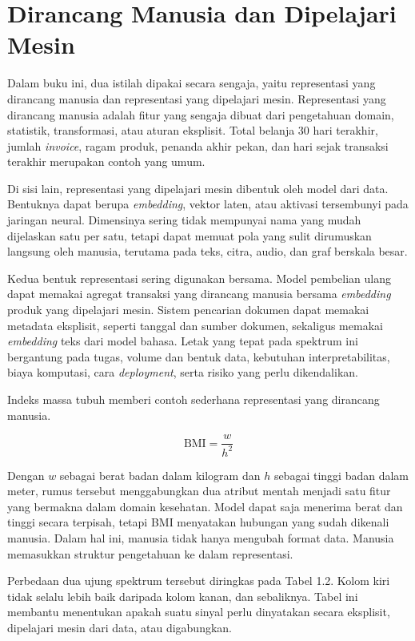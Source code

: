 \section{Dirancang Manusia dan Dipelajari Mesin}\label{dirancang-manusia-dan-dipelajari-mesin}

Dalam buku ini, dua istilah dipakai secara sengaja, yaitu representasi yang dirancang manusia dan representasi yang dipelajari mesin. Representasi yang dirancang manusia adalah fitur yang sengaja dibuat dari pengetahuan domain, statistik, transformasi, atau aturan eksplisit. Total belanja 30 hari terakhir, jumlah \emph{invoice}, ragam produk, penanda akhir pekan, dan hari sejak transaksi terakhir merupakan contoh yang umum.

Di sisi lain, representasi yang dipelajari mesin dibentuk oleh model dari data. Bentuknya dapat berupa \emph{embedding}, vektor laten, atau aktivasi tersembunyi pada jaringan neural. Dimensinya sering tidak mempunyai nama yang mudah dijelaskan satu per satu, tetapi dapat memuat pola yang sulit dirumuskan langsung oleh manusia, terutama pada teks, citra, audio, dan graf berskala besar.

Kedua bentuk representasi sering digunakan bersama. Model pembelian ulang dapat memakai agregat transaksi yang dirancang manusia bersama \emph{embedding} produk yang dipelajari mesin. Sistem pencarian dokumen dapat memakai metadata eksplisit, seperti tanggal dan sumber dokumen, sekaligus memakai \emph{embedding} teks dari model bahasa. Letak yang tepat pada spektrum ini bergantung pada tugas, volume dan bentuk data, kebutuhan interpretabilitas, biaya komputasi, cara \emph{deployment}, serta risiko yang perlu dikendalikan.

Indeks massa tubuh memberi contoh sederhana representasi yang dirancang manusia.

\[
\text{BMI} = \dfrac{w}{h^2}
\]

Dengan \(w\) sebagai berat badan dalam kilogram dan \(h\) sebagai tinggi badan dalam meter, rumus tersebut menggabungkan dua atribut mentah menjadi satu fitur yang bermakna dalam domain kesehatan. Model dapat saja menerima berat dan tinggi secara terpisah, tetapi BMI menyatakan hubungan yang sudah dikenali manusia. Dalam hal ini, manusia tidak hanya mengubah format data. Manusia memasukkan struktur pengetahuan ke dalam representasi.

Perbedaan dua ujung spektrum tersebut diringkas pada Tabel 1.2. Kolom kiri tidak selalu lebih baik daripada kolom kanan, dan sebaliknya. Tabel ini membantu menentukan apakah suatu sinyal perlu dinyatakan secara eksplisit, dipelajari mesin dari data, atau digabungkan.

